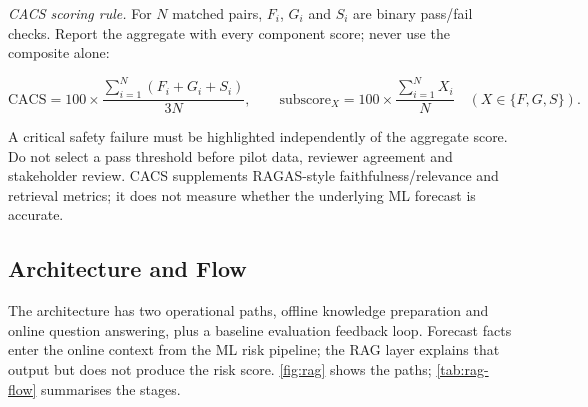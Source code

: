 \documentclass[10pt,openany]{report}
\begin{document}
\noindent\textit{CACS scoring rule.} For $N$ matched pairs, $F_i$, $G_i$ and $S_i$ are binary pass/fail
checks. Report the aggregate with every component score; never use the composite alone:

\[
\mathrm{CACS} = 100 \times \frac{\sum_{i=1}^{N}(F_i + G_i + S_i)}{3N},
\qquad
\text{subscore}_X = 100 \times \frac{\sum_{i=1}^{N} X_i}{N}
\quad (X \in \{F,G,S\}).
\]

A critical safety failure must be highlighted independently of the aggregate score. Do not select a
pass threshold before pilot data, reviewer agreement and stakeholder review. CACS supplements
RAGAS-style faithfulness/relevance and retrieval metrics; it does not measure whether the underlying
ML forecast is accurate.

\subsection{Architecture and Flow}

The architecture has two operational paths, offline knowledge preparation and online question
answering, plus a baseline evaluation feedback loop. Forecast facts enter the online context from
the ML risk pipeline; the RAG layer explains that output but does not produce the risk score.
\cref{fig:rag} shows the paths; \cref{tab:rag-flow} summarises the stages.


\end{document}
